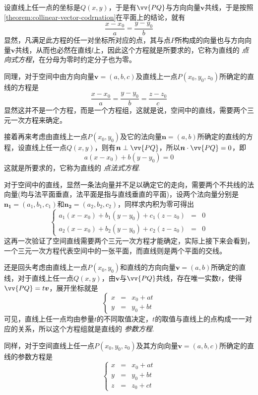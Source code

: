 设直线上任一点的坐标是$Q(x,y)$，于是有$\vv{PQ}$与方向向量$\bm{v}$共线，于是按照\autoref{theorem:collinear-vector-codrnation}在平面上的结论，就有
\[ \frac{x-x_0}{a} = \frac{y-y_0}{b} \]
显然，凡满足此方程的任一对坐标所对应的点，其与点$P$所构成的向量也与方向向量$\bm{v}$共线，从而也必然在直线$l$上，因此这个方程就是所要求的，它称为直线的 \emph{点向式方程}，在分母为零时约定分子也为零。

同理，对于空间中由方向向量$\bm{v}=(a,b,c)$及直线上一点$P(x_0,y_0,z_0)$所确定的直线的方程是
\[ \frac{x-x_0}{a} = \frac{y-y_0}{b} = \frac{z-z_0}{c} \]
显然这并不是一个方程，而是一个方程组，这就是说，空间中的直线，需要两个三元一次方程来确定。

接着再来考虑由直线上一点$P(x_0,y_0)$及它的法向量$\bm{n}=(a,b)$所确定的直线的方程，设直线上任一点$Q(x,y)$，则有$\bm{n} \perp \vv{PQ}$，所以$\bm{n} \cdot \vv{PQ} = 0$，即
\[ a(x-x_0)+b(y-y_0)=0 \]
这就是所要求的，它称为直线的 \emph{点法式方程}.

对于空间中的直线，显然一条法向量并不足以确定它的走向，需要两个不共线的法向量(均与法平面垂直，法平面是指与直线垂直的平面)，设两个法向量分别是$\bm{n_1}=(a_1,b_1,c_1)$和$\bm{n_2}=(a_2,b_2,c_2)$，同样求内积为零可得出
\[ \left\{
    \begin{array}{lll}
      a_1(x-x_0) + b_1(y-y_0) + c_1(z-z_0) & = & 0 \\
      a_2(x-x_0) + b_2(y-y_0) + c_2(z-z_0) & = & 0
    \end{array}
  \right. \]
这再一次验证了空间直线需要两个三元一次方程才能确定，实际上接下来会看到，一个三元一次方程代表空间中的一张平面，而直线则是两个平面的交线。

还是回头考虑由直线上一点$P(x_0,y_0)$和直线的方向向量$\bm{v}=(a,b)$所确定的直线，对于直线上任一点$Q(x,y)$，由$\bm{v}$与$\vv{PQ}$共线，存在唯一实数$t$，使得$\vv{PQ}=t\bm{v}$，展开坐标就是
\[ \left\{
    \begin{array}{lll}
      x & = & x_0 + at \\
      y & = & y_0 + bt
    \end{array}
  \right. \]
可见，直线上任一点均由参量$t$的不同取值决定，$t$的取值与直线上的点构成一一对应的关系，所以这个方程组就是直线的 \emph{参数方程}.

同样，对于空间直线上任一点$P(x_0,y_0,z_0)$及其方向向量$\bm{v}=(a,b,c)$所确定的直线的参数方程是
\[ \left\{
    \begin{array}{lll}
      x & = & x_0 + at \\
      y & = & y_0 + bt \\
      z & = & z_0 + ct
    \end{array}
  \right. \]

